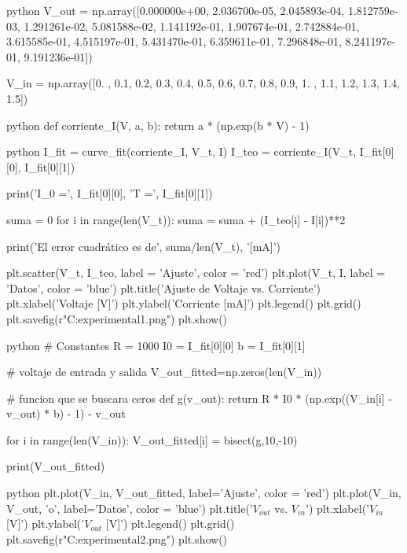 \begin{sourcecode}[\label{codigo-python}]{python}
V_out = np.array([0.000000e+00, 2.036700e-05, 2.045893e-04, 1.812759e-03,
       1.291261e-02, 5.081588e-02, 1.141192e-01, 1.907674e-01,
       2.742884e-01, 3.615585e-01, 4.515197e-01, 5.431470e-01,
       6.359611e-01, 7.296848e-01, 8.241197e-01, 9.191236e-01])

V_in = np.array([0. , 0.1, 0.2, 0.3, 0.4, 0.5, 0.6, 0.7, 0.8, 0.9, 1. , 1.1, 1.2,
       1.3, 1.4, 1.5])
\end{sourcecode}

\begin{sourcecode}[\label{codigo-python}]{python}
def corriente_I(V, a, b):
    return a * (np.exp(b * V) - 1)
\end{sourcecode}

\begin{sourcecode}[\label{codigo-python}]{python}
I_fit = curve_fit(corriente_I, V_t, I)
I_teo = corriente_I(V_t, I_fit[0][0], I_fit[0][1])

print('I_0 =', I_fit[0][0], 'T =', I_fit[0][1])

suma = 0
for i in range(len(V_t)):
    suma = suma + (I_teo[i] - I[i])**2

print('El error cuadrático es de', suma/len(V_t), '[mA]')
    
plt.scatter(V_t, I_teo, label = 'Ajuste', color = 'red')
plt.plot(V_t, I, label = 'Datos', color = 'blue')
plt.title('Ajuste de Voltaje vs. Corriente')
plt.xlabel('Voltaje [V]')
plt.ylabel('Corriente [mA]')
plt.legend()
plt.grid()
plt.savefig(r"C:\Users\Usuario\Documents\Astro experimental\graf1.png")
plt.show()
\end{sourcecode}

\begin{sourcecode}[\label{codigo-python}]{python}
# Constantes
R = 1000
I0 = I_fit[0][0]
b = I_fit[0][1]

# voltaje de entrada y salida
V_out_fitted=np.zeros(len(V_in))

# funcion que se buscara ceros
def g(v_out):
    return R * I0 * (np.exp((V_in[i] - v_out) * b) - 1) - v_out

for i in range(len(V_in)):
    V_out_fitted[i] = bisect(g,10,-10)
    
print(V_out_fitted)
\end{sourcecode}

\begin{sourcecode}[\label{codigo-python}]{python}
plt.plot(V_in, V_out_fitted, label='Ajuste', color = 'red')
plt.plot(V_in, V_out, 'o', label='Datos', color = 'blue')
plt.title('$V_{out}$ vs. $V_{in}$')
plt.xlabel('$V_{in}$ [V]')
plt.ylabel('$V_{out}$ [V]')
plt.legend()
plt.grid()
plt.savefig(r"C:\Users\Usuario\Documents\Astro experimental\graf2.png")
plt.show()
\end{sourcecode}


